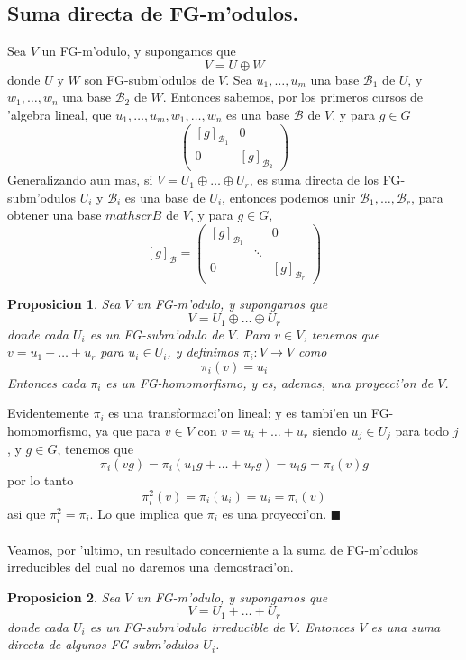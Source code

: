 \documentclass[a4paper,openright,12pt]{book}
\numberwithin{equation}{section} %
\newtheorem{proposicion}{Proposicion}[section] %
\newenvironment{proof}{\noindent{\it Demostracion:}}{\hfill$\blacksquare$} %
\begin{document}
\subsection{Suma directa de FG-m'odulos.}
Sea $V$ un FG-m'odulo, y supongamos que
\[
V=U \oplus W
\]
donde $U$ y $W$ son FG-subm'odulos de $V$. Sea $u_{1}, \ldots ,u_{m}$ una base $\mathscr{B}_{1}$ de $U$, y $w_{1}, \ldots ,w_{n}$ una base $\mathscr{B}_{2}$ de $W$. Entonces sabemos, por los primeros cursos de 'algebra lineal, que $u_{1}, \ldots ,u_{m},w_{1}, \ldots ,w_{n}$ es una base $\mathscr{B}$ de $V$, y para $g \in G$
\[
\left( \begin{array}{c|c}
  [g]_{\mathscr{B}_{1}} & 0 \\ 
  \hline
  0 & [g]_{\mathscr{B}_{2}}
 \end{array} \right)
\]
Generalizando aun mas, si $V=U_{1} \oplus \ldots \oplus U_{r}$, es suma directa de los FG-subm'odulos $U_{i}$ y $\mathscr{B}_{i}$ es una base de $U_{i}$, entonces podemos unir $\mathscr{B}_{1}, \ldots ,\mathscr{B}_{r}$, para obtener una base $mathscr{B}$ de $V$, y para $g \in G$,
\[
[g]_{\mathscr{B}} =
\left( \begin{array}{ccc}
 [g]_{\mathscr{B}_{1}} & & 0 \\ 
  
   & \ddots &  \\
  0 & & [g]_{\mathscr{B}_{r}}
\end{array} \right) 
\]
\begin{proposicion}
Sea $V$ un FG-m'odulo, y supongamos que
\[
V=U_{1} \oplus \ldots \oplus U_{r}
\]
donde cada $U_{i}$ es un FG-subm'odulo de $V$. Para $v \in V$, tenemos que $v=u_{1}+ \ldots + u_{r}$ para $u_{i} \in U_{i}$, y definimos $\pi_{i}:V \rightarrow V$ como 
\[
\pi_{i}(v)=u_{i}
\]
Entonces cada $\pi_{i}$ es un FG-homomorfismo, y es, ademas, una proyecci'on de $V$.
\end{proposicion}
\begin{proof}
Evidentemente $\pi_{i}$ es una transformaci'on lineal; y es tambi'en un FG-homomorfismo, ya que para $v \in V$ con $v=u_{i}+ \ldots +u_{r}$ siendo $u_{j} \in U_{j}$ para todo $j$, y $g \in G$, tenemos que
\[
\pi_{i}(vg)=\pi_{i}(u_{1}g+ \ldots +u_{r}g)=u_{i}g=\pi_{i}(v)g
\]
por lo tanto 
\[
\pi_{i}^{2}(v)=\pi_{i}(u_{i})=u_{i}=\pi_{i}(v)
\]
asi que $\pi_{i}^{2}=\pi_{i}$. Lo que implica que $\pi_{i}$ es una proyecci'on.
\end{proof}\\
\\
Veamos, por 'ultimo, un resultado concerniente a la suma de FG-m'odulos irreducibles del cual no daremos una demostraci'on.
\begin{proposicion}
Sea $V$ un FG-m'odulo, y supongamos que
\[
V=U_{1}+\ldots +U_{r}
\]
donde cada $U_{i}$ es un FG-subm'odulo irreducible de $V$. Entonces $V$ es una suma directa de algunos FG-subm'odulos $U_{i}$.
\end{proposicion}
\end{document}
